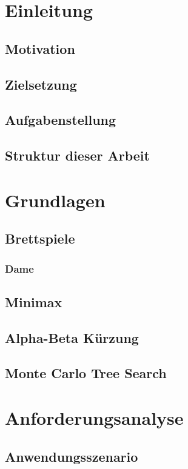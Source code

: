 \documentclass[12pt,a4paper,bibliography=totocnumbered,listof=totocnumbered]{article}
\begin{document}
\section{Einleitung}
\subsection{Motivation}
\subsection{Zielsetzung}
\subsection{Aufgabenstellung}
\subsection{Struktur dieser Arbeit}

\section{Grundlagen}
\subsection{Brettspiele}
\subsubsection{Dame}
\subsection{Minimax}
\subsection{Alpha-Beta Kürzung}
\subsection{Monte Carlo Tree Search}

\section{Anforderungsanalyse}
\subsection{Anwendungsszenario}
\end{document}
